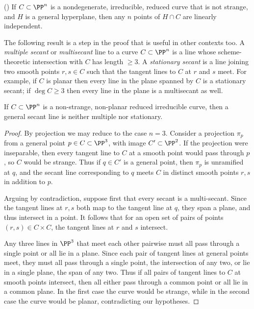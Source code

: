 \begin{proposition} \label{basic linear independence}(\cite[Lemma 1.1]{Rathmann})
If $C\subset \PP^n$ is a nondegenerate, irreducible, reduced curve that is not strange,
and $H$ is a general hyperplane, then any $n$ points of $H\cap C$ are
linearly independent.
\end{proposition}

The following result is a step in the proof that is useful in other contexts too. 
A \emph{multiple secant} or \emph{multisecant} line to a curve $C\subset \PP^n$ is a line whose
scheme-theoretic intersection with $C$ has length $\geq 3$.  A \emph{stationary
secant} is a line joining two smooth points $r,s\in C$ such that the tangent lines
to $C$ at $r$ and $s$ meet. For example, if $C$ is planar then every line in the plane
spanned by $C$ is a stationary secant; if $\deg C\geq 3$ then every
line in the plane is a multisecant as well. 

\begin{lemma}\label{incident tangents}
If $C\subset \PP^n$ is a non-strange, non-planar reduced irreducible curve, then
a general secant line is neither multiple nor stationary.
\end{lemma}

\begin{proof}
 By projection we may reduce to the case $n=3$. Consider a projection $\pi_p$
from a general point $p\in C\subset \PP^3$, with image $C'\subset \PP^2$. If the projection were inseparable, then
every tangent line to $C$ at a smooth point would pass through $p$, so $C$ would be strange.
Thus if $q\in C'$ is a general point, then $\pi_p$ is unramified at $q$,
and the secant line corresponding to $q$ meets $C$ in distinct smooth points $r,s$
in addition to $p$.

Arguing by contradiction, suppose first that every secant is a multi-secant.
Since the tangent lines at $r,s$ both map to the tangent line at $q$,
they span a plane, and thus intersect
in a point. It follows that for an open set of pairs of points
$(r,s)\in C\times C$, the tangent lines at $r$ and $s$ intersect. 

Any three lines in $\PP^3$ that meet each other pairwise must all pass through
a single point or all lie in a plane. Since each pair of tangent lines at general points meet, they must all pass through
a single point, the intersection of any two, or lie in a single plane, the span of any two. Thus if all pairs of tangent lines to $C$ at smooth points intersect, then all either
pass through a common point or all lie in a common plane. In the first case the curve would be strange,
while in the second case the curve would be planar, contradicting our hypotheses. \end{proof}

